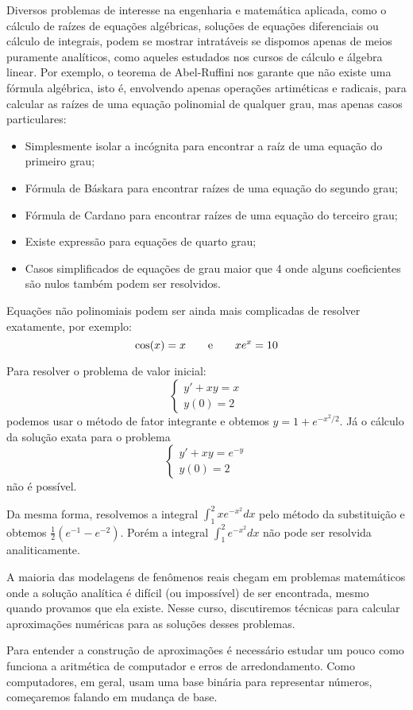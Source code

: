 \documentclass[livro.tex]{subfiles}
\begin{document}
Diversos problemas de interesse na engenharia e matemática aplicada, como  o cálculo de raízes de equações algébricas, soluções de equações diferenciais ou cálculo de integrais, podem se mostrar intratáveis se dispomos apenas de meios puramente analíticos, como aqueles estudados nos cursos de cálculo e álgebra linear. Por exemplo, o teorema de Abel-Ruffini nos garante que não existe uma fórmula algébrica, isto é, envolvendo apenas operações artiméticas e radicais, para calcular as raízes de uma equação polinomial de qualquer grau, mas apenas casos particulares:
\begin{itemize}
\item Simplesmente isolar a incógnita para encontrar a raíz de uma equação do primeiro grau;
\item Fórmula de Báskara para encontrar raízes de uma equação do segundo grau;
\item Fórmula de Cardano para encontrar raízes de uma equação do terceiro grau;
\item Existe expressão para equações de quarto grau;
\item Casos simplificados de equações de grau maior que 4 onde alguns coeficientes são nulos também podem ser resolvidos.
\end{itemize}

Equações não polinomiais podem ser ainda mais complicadas de resolver exatamente, por exemplo:
\begin{equation}
\cos(x)=x\qquad \hbox{e}\qquad xe^x= 10
\end{equation}

Para resolver o problema de valor inicial:
\begin{equation}
\left\{
\begin{array}{l}
y'+xy=x\\
y(0)=2
\end{array}\right.
\end{equation}
podemos usar o método de fator integrante e obtemos $y=1+e^{-x^2/2}$. Já o cálculo da solução exata para o problema 
\begin{equation}
\left\{
\begin{array}{l}
y'+xy=e^{-y}\\
y(0)=2
\end{array}\right.
\end{equation}
não é possível.

Da mesma forma, resolvemos a integral
$
\int_1^2xe^{-x^2}dx
$
pelo método da substituição e obtemos $\frac{1}{2}(e^{-1}-e^{-2})$. Porém a integral
$
\int_1^2 e^{-x^2} dx
$
não pode ser resolvida analiticamente.

A maioria das modelagens de fenômenos reais chegam em problemas matemáticos onde a solução analítica é difícil (ou impossível) de ser encontrada, mesmo quando provamos que ela existe. Nesse curso, discutiremos técnicas para calcular aproximações numéricas para as soluções desses problemas.

Para entender a construção de aproximações é necessário estudar um pouco como funciona a aritmética de computador e erros de arredondamento. Como computadores, em geral, usam uma base binária para representar números, começaremos falando em mudança de base.
\end{document}
